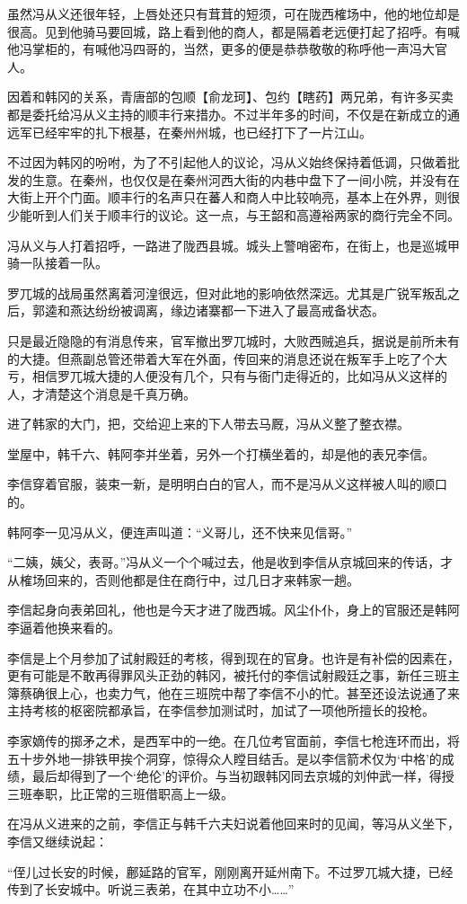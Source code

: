 虽然冯从义还很年轻，上唇处还只有茸茸的短须，可在陇西榷场中，他的地位却是很高。见到他骑马要回城，路上看到他的商人，都是隔着老远便打起了招呼。有喊他冯掌柜的，有喊他冯四哥的，当然，更多的便是恭恭敬敬的称呼他一声冯大官人。

因着和韩冈的关系，青唐部的包顺【俞龙珂】、包约【瞎药】两兄弟，有许多买卖都是委托给冯从义主持的顺丰行来措办。不过半年多的时间，不仅是在新成立的通远军已经牢牢的扎下根基，在秦州州城，也已经打下了一片江山。

不过因为韩冈的吩咐，为了不引起他人的议论，冯从义始终保持着低调，只做着批发的生意。在秦州，也仅仅是在秦州河西大街的内巷中盘下了一间小院，并没有在大街上开个门面。顺丰行的名声只在蕃人和商人中比较响亮，基本上在外界，则很少能听到人们关于顺丰行的议论。这一点，与王韶和高遵裕两家的商行完全不同。

冯从义与人打着招呼，一路进了陇西县城。城头上警哨密布，在街上，也是巡城甲骑一队接着一队。

罗兀城的战局虽然离着河湟很远，但对此地的影响依然深远。尤其是广锐军叛乱之后，郭逵和燕达纷纷被调离，缘边诸寨都一下进入了最高戒备状态。

只是最近隐隐的有消息传来，官军撤出罗兀城时，大败西贼追兵，据说是前所未有的大捷。但燕副总管还带着大军在外面，传回来的消息还说在叛军手上吃了个大亏，相信罗兀城大捷的人便没有几个，只有与衙门走得近的，比如冯从义这样的人，才清楚这个消息是千真万确。

进了韩家的大门，把，交给迎上来的下人带去马厩，冯从义整了整衣襟。

堂屋中，韩千六、韩阿李并坐着，另外一个打横坐着的，却是他的表兄李信。

李信穿着官服，装束一新，是明明白白的官人，而不是冯从义这样被人叫的顺口的。

韩阿李一见冯从义，便连声叫道：“义哥儿，还不快来见信哥。”

“二姨，姨父，表哥。”冯从义一个个喊过去，他是收到李信从京城回来的传话，才从榷场回来的，否则他都是住在商行中，过几日才来韩家一趟。

李信起身向表弟回礼，他也是今天才进了陇西城。风尘仆仆，身上的官服还是韩阿李逼着他换来看的。

李信是上个月参加了试射殿廷的考核，得到现在的官身。也许是有补偿的因素在，更有可能是不敢再得罪风头正劲的韩冈，被托付的李信试射殿廷之事，新任三班主簿蔡确很上心，也卖力气，他在三班院中帮了李信不小的忙。甚至还设法说通了来主持考核的枢密院都承旨，在李信参加测试时，加试了一项他所擅长的投枪。

李家嫡传的掷矛之术，是西军中的一绝。在几位考官面前，李信七枪连环而出，将五十步外地一排铁甲挨个洞穿，惊得众人瞠目结舌。是以李信箭术仅为‘中格’的成绩，最后却得到了一个‘绝伦’的评价。与当初跟韩冈同去京城的刘仲武一样，得授三班奉职，比正常的三班借职高上一级。

在冯从义进来的之前，李信正与韩千六夫妇说着他回来时的见闻，等冯从义坐下，李信又继续说起：

“侄儿过长安的时候，鄜延路的官军，刚刚离开延州南下。不过罗兀城大捷，已经传到了长安城中。听说三表弟，在其中立功不小……”


